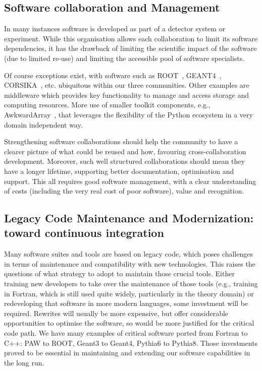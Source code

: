 \subsection{Software collaboration and Management}


In many instances software is developed as part of a detector system or experiment. While this organisation allows each collaboration to limit its software dependencies, it has the drawback of limiting the scientific impact of the software (due to limited re-use) and limiting the accessible pool of software specialists.

Of course exceptions exist, with software such as ROOT~\cite{Brun1996}, GEANT4~\cite{Agostinelli2003}, CORSIKA~\cite{Heck:1998vt}, etc. ubiquitous within our three communities. Other examples are middleware which provides key functionality to manage and access storage and computing resources. More use of smaller toolkit components, e.g., AwkwardArray~\cite{Pivarski_Awkward_Array_2018}, that leverages the flexibility of the Python ecosystem in a very domain independent way.

Strengthening software collaborations should help the community to have a clearer picture of what could be reused and how, favouring cross-collaboration development. Moreover, such well structured collaborations should mean they have a longer lifetime, supporting better documentation, optimisation and support. This all requires good software management, with a clear understanding of costs (including the very real cost of poor software), value and recognition.


\subsection{Legacy Code Maintenance and Modernization: toward continuous integration}

Many software suites and tools are based on legacy code, which poses challenges in terms of maintenance and compatibility with new technologies. This raises the questions of what strategy to adopt to maintain those crucial tools. Either training new developers to take over the maintenance of those tools (e.g., training in Fortran, which is still used quite widely, particularly in the theory domain) or redeveloping that software in more modern languages, some investment will be required. Rewrites will usually be more expensive, but offer considerable opportunities to optimise the software, so would be more justified for the critical code path. We have many examples of critical software ported from Fortran to C++: PAW to ROOT, Geant3 to Geant4, Pythia6 to Pythia8. Those investments proved to be essential in maintaining and extending our software capabilities in the long run.

